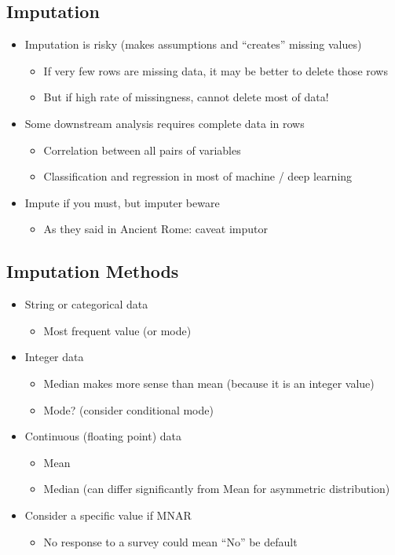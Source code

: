 \documentclass[11pt]{article}
\theoremstyle{definition}
\begin{document}
\subsection{Imputation}
\begin{itemize}
    \item Imputation is risky (makes assumptions and “creates” missing values)
    \begin{itemize}
        \item If very few rows are missing data, it may be better to delete those rows
        \item But if high rate of missingness, cannot delete most of data!
    \end{itemize}
    \item Some downstream analysis requires complete data in rows
    \begin{itemize}
        \item Correlation between all pairs of variables
        \item Classification and regression in most of machine / deep learning
    \end{itemize}
    \item Impute if you must, but imputer beware
    \begin{itemize}
        \item As they said in Ancient Rome: caveat imputor
    \end{itemize}
\end{itemize}

\subsection{Imputation Methods}
\begin{itemize}
    \item String or categorical data
    \begin{itemize}
        \item Most frequent value (or mode)
    \end{itemize}
    \item Integer data
    \begin{itemize}
        \item Median makes more sense than mean (because it is an integer value)
        \item Mode? (consider conditional mode)
    \end{itemize}
    \item Continuous (floating point) data
    \begin{itemize}
        \item Mean
        \item Median (can differ significantly from Mean for asymmetric distribution)
    \end{itemize}
    \item Consider a specific value if MNAR
    \begin{itemize}
        \item No response to a survey could mean “No” be default
    \end{itemize}
\end{itemize}
\end{document}

